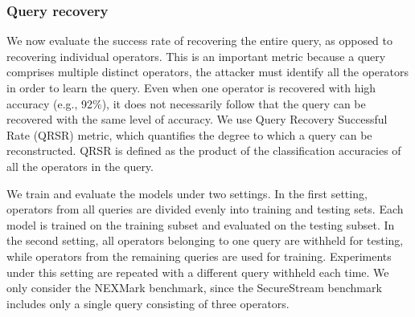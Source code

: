 \subsubsection{Query recovery}
We now evaluate the success rate of recovering the entire query, as opposed to recovering individual operators. This is an important metric because a query comprises multiple distinct operators, the attacker must identify all the operators in order to learn the query. Even when one operator is recovered with high accuracy (e.g., 92\%), it does not necessarily follow that the query can be recovered with the same level of accuracy. We use Query Recovery Successful Rate (QRSR) metric, which quantifies the degree to which a query can be reconstructed. QRSR is defined as the product of the classification accuracies of all the operators in the query.

We train and evaluate the models under two settings. In the first setting, operators from all queries are divided evenly into training and testing sets. Each model is trained on the training subset and evaluated on the testing subset. In the second setting, all operators belonging to one query are withheld for testing, while operators from the remaining queries are used for training. Experiments under this setting are repeated with a different query withheld each time. We only consider the NEXMark benchmark, since the SecureStream benchmark includes only a single query consisting of three operators.

